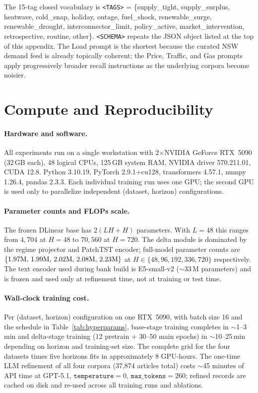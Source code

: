 \documentclass{article}
\begin{document}
The 15-tag closed vocabulary is \texttt{<TAGS>} = \{supply\_tight, supply\_surplus, heatwave, cold\_snap, holiday, outage, fuel\_shock, renewable\_surge, renewable\_drought, interconnector\_limit, policy\_active, market\_intervention, retrospective, routine, other\}. \texttt{<SCHEMA>} repeats the JSON object listed at the top of this appendix. The Load prompt is the shortest because the curated NSW demand feed is already topically coherent; the Price, Traffic, and Gas prompts apply progressively broader recall instructions as the underlying corpora become noisier.

\section{Compute and Reproducibility}
\label{app:compute}

\paragraph{Hardware and software.}
All experiments run on a single workstation with 2$\times$NVIDIA GeForce RTX~5090 (32\,GB each), 48 logical CPUs, 125\,GB system RAM, NVIDIA driver 570.211.01, CUDA 12.8. Python 3.10.19, PyTorch 2.9.1+cu128, transformers 4.57.1, numpy 1.26.4, pandas 2.3.3. Each individual training run uses one GPU; the second GPU is used only to parallelize independent (dataset, horizon) configurations.

\paragraph{Parameter counts and FLOPs scale.}
The frozen DLinear base has $2(LH{+}H)$ parameters. With $L{=}48$ this ranges from $4{,}704$ at $H{=}48$ to $70{,}560$ at $H{=}720$. The delta module is dominated by the regime projector and PatchTST encoder; full-model parameter counts are $\{1.97{\rm M},\,1.99{\rm M},\,2.02{\rm M},\,2.08{\rm M},\,2.23{\rm M}\}$ at $H\in\{48,96,192,336,720\}$ respectively. The text encoder used during bank build is E5-small-v2 ($\sim$33\,M parameters) and is frozen and used only at refinement time, not at training or test time.

\paragraph{Wall-clock training cost.}
Per (dataset, horizon) configuration on one RTX~5090, with batch size 16 and the schedule in Table~\ref{tab:hyperparams}, base-stage training completes in $\sim$1--3\,min and delta-stage training (12 pretrain + 30--50 main epochs) in $\sim$10--25\,min depending on horizon and training-set size. The complete grid for the four datasets times five horizons fits in approximately 8 GPU-hours. The one-time LLM refinement of all four corpora (37{,}874 articles total) costs $\sim$45 minutes of API time at GPT-5.1, $\texttt{temperature}{=}0$, $\texttt{max\_tokens}{=}260$; refined records are cached on disk and re-used across all training runs and ablations.
\end{document}
